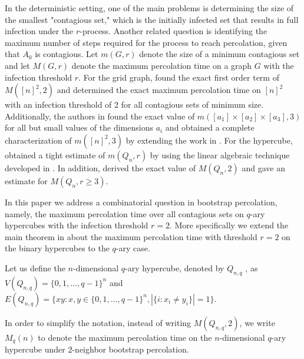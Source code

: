 \documentclass[reqno,11pt]{amsart}
\renewcommand{\geq}{\geqslant}
\begin{document}
In the deterministic setting, one of the main problems is determining the size of the smallest "contagious set," which is the initially infected set that results in full infection under the $r$-process. Another related question is identifying the maximum number of steps required for the process to reach percolation, given that $A_0$ is contagious. Let $m(G,r)$ denote the size of a minimum contagious set and let $M(G,r)$ denote the maximum percolation time on a graph $G$ with the infection threshold $r$. For the grid graph, \cite{Benevides} found the exact first order term of $M([n]^2,2)$ and \cite{Fabricio2} determined the exact maximum percolation time on $[n]^2$ with an infection threshold of $2$ for all contagious sets of minimum size. Additionally, the authors in \cite{dukes2023extremalboundsthreeneighbourbootstrap}
found the exact value of $m([a_1] \times [a_2] \times [a_3],3)$ for all but small values of 
the dimensions $a_i$ and obtained a complete characterization of $m([n]^2,3)$ by extending the work in \cite{Fabricio}. For the hypercube, \cite{MORRISON201861} obtained a tight estimate of $m(Q_n,r)$ by using the linear algebraic technique developed in \cite{Balough2012}. In addition, \cite{Michal} derived the exact value of $M(Q_n,2)$ and \cite{Ivailo} gave an estimate for $M(Q_n,r \geq 3)$. 


In this paper we address a combinatorial question in bootstrap percolation, namely, the maximum percolation time over all contagious sets on $q$-ary hypercubes with the infection threshold $r=2$. More specifically we extend the main theorem in \cite{Michal} about the maximum percolation time with threshold $r=2$ on the binary hypercubes to the $q$-ary case.

Let us define the $n$-dimensional $q$-ary hypercube, denoted by $Q_{n,q}$ , as $V(Q_{n,q})=\{0,1,\dots,q-1\}^n$ and $E(Q_{n,q})=\{xy: x,y \in \{0,1,\dots,q-1\}^n, |\{i: x_i \neq y_i\}|=1\}$. 

In order to simplify the notation, instead of writing $M(Q_{n,q},2)$, we write $M_q(n)$ to denote the maximum percolation time on the $n$-dimensional $q$-ary hypercube under $2$-neighbor bootstrap percolation. 
\end{document}
